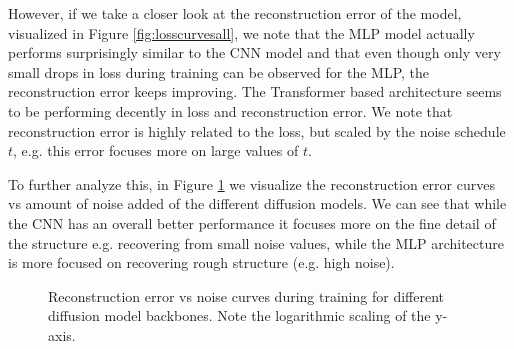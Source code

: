 



However, if we take a closer look at the reconstruction error of the model, visualized in Figure \ref{fig:losscurvesall}, we note that the MLP model actually performs surprisingly similar to the CNN model and that even though only very small drops in loss during training can be observed for the MLP, the reconstruction error keeps improving. The Transformer based architecture seems to be performing decently in loss and reconstruction error.
We note that reconstruction error is highly related to the loss, but scaled by the noise schedule $t$, e.g. this error focuses more on large values of $t$.

To further analyze this, in Figure \ref{fig:lossvsnoise} we visualize the reconstruction error curves vs amount of noise added of the different diffusion models. We can see that while the CNN has an overall better performance it focuses more on the fine detail of the structure e.g. recovering from small noise values, while the MLP architecture is more focused on recovering rough structure (e.g. high noise). 

\begin{figure}
    \centering

    
    \caption{Reconstruction error vs noise curves during training for different diffusion model backbones. Note the logarithmic scaling of the y-axis. }
    \label{fig:lossvsnoise}
\end{figure}



